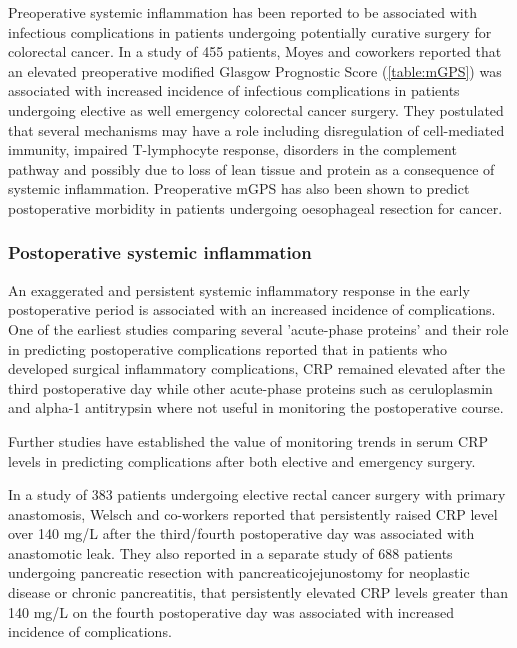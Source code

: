 Preoperative systemic inflammation has been reported to be associated with infectious complications in patients undergoing potentially curative surgery for colorectal cancer.\parencite{moyes_preoperative_2009} In a study of 455 patients, Moyes and coworkers reported that an elevated preoperative modified Glasgow Prognostic Score (\ref{table:mGPS}) was associated with increased incidence of infectious complications in patients undergoing elective as well emergency colorectal cancer surgery. They postulated that several mechanisms may have a role including disregulation of cell-mediated immunity, impaired T-lymphocyte response, disorders in the complement pathway and possibly due to loss of lean tissue and protein as a consequence of systemic inflammation. Preoperative mGPS has also been shown to predict postoperative morbidity in patients undergoing oesophageal resection for cancer.\parencite{vashist_glasgow_2010} 

\subsubsection{Postoperative systemic inflammation}
An exaggerated and persistent systemic inflammatory response in the early postoperative period is associated with an increased incidence of complications. One of the earliest studies comparing several 'acute-phase proteins' and their role in predicting postoperative complications reported that in patients who developed surgical inflammatory complications, CRP remained elevated after the third postoperative day while other acute-phase proteins such as ceruloplasmin and alpha-1 antitrypsin where not useful in monitoring the postoperative course.\parencite{fischer_quantitation_1976} 

Further studies have established the value of monitoring trends in serum CRP levels in predicting complications after both elective and emergency surgery.\parencite{mustard_c-reactive_1987}

In a study of 383 patients undergoing elective rectal cancer surgery with primary anastomosis, Welsch and co-workers reported that persistently raised CRP level over 140 mg/L after the third/fourth postoperative day was associated with anastomotic leak.\parencite{welsch_c-reactive_2007} They also reported in a separate study of 688 patients undergoing pancreatic resection with pancreaticojejunostomy for neoplastic disease or chronic pancreatitis, that persistently elevated CRP levels greater than 140 mg/L on the fourth postoperative day was associated with increased incidence of complications. 

